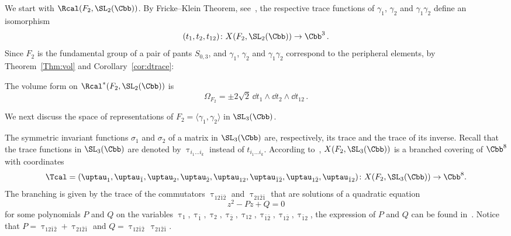 We start with $\Rcal(F_2,\SL_2(\Cbb))$. By Fricke--Klein Theorem, see~\cite{Goldman09}, the respective trace functions of $\gamma_1$, $\gamma_2$ and $\gamma_{1}\gamma_2$ define an isomorphism
\begin{equation}\label{eqn:Fricke}
(t_1,t_2,t_{12})\colon X(F_2,\SL_2(\Cbb))\to \Cbb^3\,.
\end{equation}
Since $F_2$ is the fundamental group of a pair of pants $S_{0,3} $, and $\gamma_1$, $\gamma_2$ and $\gamma_{1}\gamma_2$ correspond to the peripheral elements, by Theorem~\ref{Thm:vol} and Corollary~\ref{cor:dtrace}:

\begin{coro}\label{cor:C3}
The volume form on $\Rcal^*(F_2,\SL_2(\Cbb))$ is
\[
\Omega_{ F_2}= \pm 2\sqrt{2}\, \dd t_1 \wedge \dd t_2 \wedge \dd t_{12}\,.
\]
\end{coro}


We next discuss the space of representations of $F_2=\langle \gamma_1,\gamma_2\rangle$ in $\SL_3(\Cbb)$.



The symmetric invariant functions $\sigma_1$ and $\sigma_2$ of a matrix in $\SL_3(\Cbb)$ are, respectively, its trace and the trace of its inverse. Recall that the trace functions in $\SL_3(\Cbb)$ are denoted by $\uptau_{i_1\dots i_k}$ instead of $t_{i_1\dots i_k}$. According to~\cite{LawtonJA}, $X(F_2,\SL_3(\Cbb))$ is a branched covering of $\Cbb^8$ with coordinates
\[
\Tcal=(\uptau_1,\uptau_{\bar 1},\uptau_2,\uptau_{\bar 2},\uptau_{12},\uptau_{\bar 1\bar 2},\uptau_{1\bar 2}, \uptau_{\bar 12})
\colon X(F_2, \SL_3(\Cbb))\to \Cbb^8.
\]
The branching is given by the trace of the commutators $\uptau_{12\bar1\bar2}$ and $\uptau_{21\bar 2\bar 1}$ that are solutions of a quadratic equation
\[
z^2 - P z + Q = 0
\]
for some polynomials $P$ and $Q$ on the variables $\uptau_1,\uptau_{\bar 1},\uptau_2,\uptau_{\bar 2},\uptau_{12},\uptau_{\bar 1\bar 2},\uptau_{1\bar 2}, \uptau_{\bar 12}$, the expression of $P$ and $Q$ can be found in~\cite{LawtonJA,LawtonP}. Notice that $P= \uptau_ {12\bar1\bar2} + \uptau_{21\bar 2\bar 1}$ and $Q = \uptau_ {12\bar1\bar2} \, \uptau_{21\bar 2\bar 1}$.

